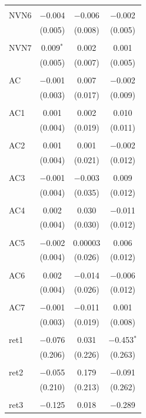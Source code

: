 \begin{table}[!htbp]
\begin{tabular}{@{\extracolsep{5pt}}lccc}
  & & & \\ 
 NVN6 & $-$0.004 & $-$0.006 & $-$0.002 \\ 
  & (0.005) & (0.008) & (0.005) \\ 
  & & & \\ 
 NVN7 & 0.009$^{*}$ & 0.002 & 0.001 \\ 
  & (0.005) & (0.007) & (0.005) \\ 
  & & & \\ 
 AC & $-$0.001 & 0.007 & $-$0.002 \\ 
  & (0.003) & (0.017) & (0.009) \\ 
  & & & \\ 
 AC1 & 0.001 & 0.002 & 0.010 \\ 
  & (0.004) & (0.019) & (0.011) \\ 
  & & & \\ 
 AC2 & 0.001 & 0.001 & $-$0.002 \\ 
  & (0.004) & (0.021) & (0.012) \\ 
  & & & \\ 
 AC3 & $-$0.001 & $-$0.003 & 0.009 \\ 
  & (0.004) & (0.035) & (0.012) \\ 
  & & & \\ 
 AC4 & 0.002 & 0.030 & $-$0.011 \\ 
  & (0.004) & (0.030) & (0.012) \\ 
  & & & \\ 
 AC5 & $-$0.002 & 0.00003 & 0.006 \\ 
  & (0.004) & (0.026) & (0.012) \\ 
  & & & \\ 
 AC6 & 0.002 & $-$0.014 & $-$0.006 \\ 
  & (0.004) & (0.026) & (0.012) \\ 
  & & & \\ 
 AC7 & $-$0.001 & $-$0.011 & 0.001 \\ 
  & (0.003) & (0.019) & (0.008) \\ 
  & & & \\ 
 ret1 & $-$0.076 & 0.031 & $-$0.453$^{*}$ \\ 
  & (0.206) & (0.226) & (0.263) \\ 
  & & & \\ 
 ret2 & $-$0.055 & 0.179 & $-$0.091 \\ 
  & (0.210) & (0.213) & (0.262) \\ 
  & & & \\ 
 ret3 & $-$0.125 & 0.018 & $-$0.289 \\ 

\end{tabular}
\end{table}
